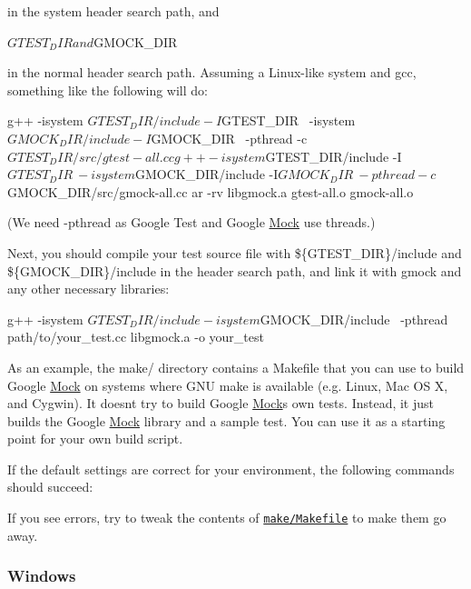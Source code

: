 in the system header search path, and \begin{DoxyVerb}${GTEST_DIR} and ${GMOCK_DIR}
\end{DoxyVerb}


in the normal header search path. Assuming a Linux-\/like system and gcc, something like the following will do\+: \begin{DoxyVerb}g++ -isystem ${GTEST_DIR}/include -I${GTEST_DIR} \
    -isystem ${GMOCK_DIR}/include -I${GMOCK_DIR} \
    -pthread -c ${GTEST_DIR}/src/gtest-all.cc
g++ -isystem ${GTEST_DIR}/include -I${GTEST_DIR} \
    -isystem ${GMOCK_DIR}/include -I${GMOCK_DIR} \
    -pthread -c ${GMOCK_DIR}/src/gmock-all.cc
ar -rv libgmock.a gtest-all.o gmock-all.o
\end{DoxyVerb}


(We need -\/pthread as Google Test and Google \hyperlink{classMock}{Mock} use threads.)

Next, you should compile your test source file with \$\{G\+T\+E\+S\+T\+\_\+\+D\+IR\}/include and \$\{G\+M\+O\+C\+K\+\_\+\+D\+IR\}/include in the header search path, and link it with gmock and any other necessary libraries\+: \begin{DoxyVerb}g++ -isystem ${GTEST_DIR}/include -isystem ${GMOCK_DIR}/include \
    -pthread path/to/your_test.cc libgmock.a -o your_test
\end{DoxyVerb}


As an example, the make/ directory contains a Makefile that you can use to build Google \hyperlink{classMock}{Mock} on systems where G\+NU make is available (e.\+g. Linux, Mac OS X, and Cygwin). It doesn\textquotesingle{}t try to build Google \hyperlink{classMock}{Mock}\textquotesingle{}s own tests. Instead, it just builds the Google \hyperlink{classMock}{Mock} library and a sample test. You can use it as a starting point for your own build script.

If the default settings are correct for your environment, the following commands should succeed\+: 


If you see errors, try to tweak the contents of \href{make/Makefile}{\tt make/\+Makefile} to make them go away.

\subsubsection*{Windows}

